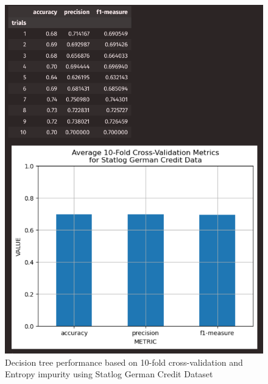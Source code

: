 \documentclass{article}
\begin{document}
    \begin{figure}[H]
        \centering
        \begin{minipage}[t]{0.47\textwidth}
            \centering
            \includegraphics[width=\textwidth, height=0.35\textheight]{1cg.png}
            \caption{Decision tree performance based on 10-fold cross-validation and Entropy impurity using Statlog German Credit Dataset}
        \end{minipage}
        \hfill
        \begin{minipage}[t]{0.47\textwidth}
            \centering

\end{minipage}
\end{figure}
\end{document}
